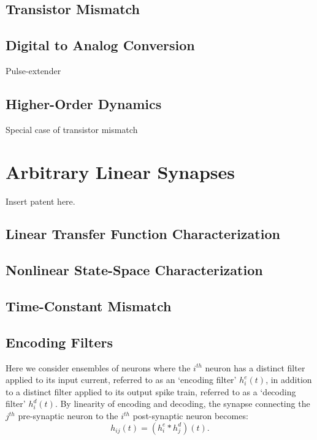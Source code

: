 \subsection{Transistor Mismatch}

\subsection{Digital to Analog Conversion}

Pulse-extender

\subsection{Higher-Order Dynamics}

Special case of transistor mismatch


\section{Arbitrary Linear Synapses}

Insert patent here.

\subsection{Linear Transfer Function Characterization}

\subsection{Nonlinear State-Space Characterization}

\subsection{Time-Constant Mismatch}

\subsection{Encoding Filters}

Here we consider ensembles of neurons where the $i^{th}$ neuron has a distinct filter applied to its input current, referred to as an `encoding filter' $h^e_i(t)$, in addition to a distinct filter applied to its output spike train, referred to as a `decoding filter' $h^d_i(t)$. 
By linearity of encoding and decoding, the synapse connecting the $j^{th}$ pre-synaptic neuron to the $i^{th}$ post-synaptic neuron becomes:
\begin{equation} \label{eq:syn-factored}
h_{ij}(t) = (h^e_i \ast h^d_j)(t) .
\end{equation}

